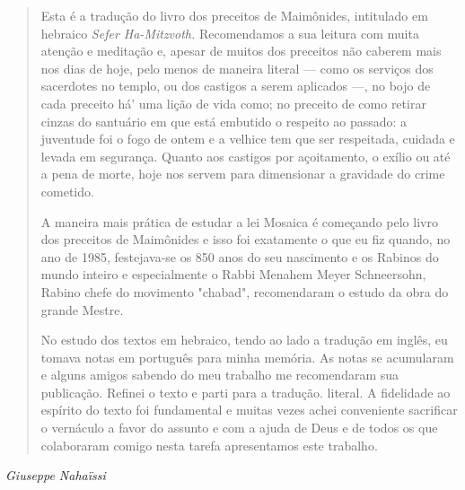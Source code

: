 \begin{quote}
Esta é a tradução do livro dos preceitos de Maimônides, intitulado em
hebraico \emph{Sefer Ha-Mitzvoth.} Recomendamos a sua leitura com muita
atenção e me­ditação e, apesar de muitos dos preceitos não caberem mais
nos dias de hoje, pelo menos de maneira literal --- como os serviços dos
sacerdotes no templo, ou dos cas­tigos a serem aplicados ---, no bojo de
cada preceito há' uma lição de vida como; no preceito de como retirar
cinzas do santuário em que está embutido o respeito ao passado: a
juventude foi o fogo de ontem e a velhice tem que ser respeitada,
cui­dada e levada em segurança. Quanto aos castigos por açoitamento, o
exílio ou até a pena de morte, hoje nos servem para dimensionar a
gravidade do crime cometido.

A maneira mais prática de estudar a lei Mosaica é começando pelo livro
dos preceitos de Maimônides e isso foi exatamente o que eu fiz quando,
no ano de 1985, festejava-se os 850 anos do seu nascimento e os Rabinos
do mundo inteiro e especialmente o Rabbi Menahem Meyer Schneersohn,
Rabino chefe do movimento "chabad", recomendaram o estudo da obra do
grande Mestre.

No estudo dos textos em hebraico, tendo ao lado a tradução em inglês, eu
tomava notas em português para minha memória. As notas se acumularam e
al­guns amigos sabendo do meu trabalho me recomendaram sua publicação.
Refinei o texto e parti para a tradução. literal. A fidelidade ao
espírito do texto foi funda­mental e muitas vezes achei conveniente
sacrificar o vernáculo a favor do assunto e com a ajuda de Deus e de
todos os que colaboraram comigo nesta tarefa apresen­tamos este
trabalho.
\end{quote}

\emph{Giuseppe Nahaïssi}

